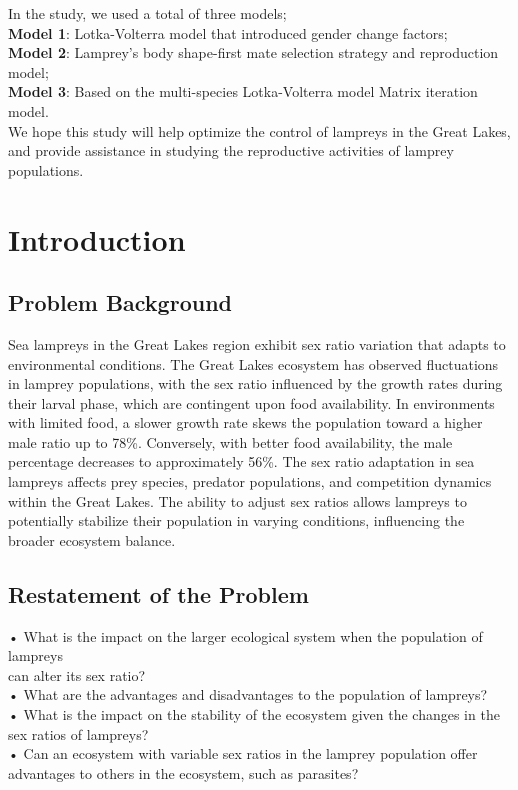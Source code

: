 \documentclass[12pt]{article}
\begin{document}
In the study, we used a total of three models; \\
\textbf{Model 1}: Lotka-Volterra model that introduced gender change factors;\\
\textbf{Model 2}: Lamprey's body shape-first mate selection strategy and reproduction model;\\
\textbf{Model 3}: Based on the multi-species Lotka-Volterra model Matrix iteration model. \\We hope this study will help optimize the control of lampreys in the Great Lakes, and provide assistance in studying the reproductive activities of lamprey populations. 
\newpage
\tableofcontents
\newpage
\clearpage
\pagestyle{fancy}
\newpage
\setcounter{page}{1}


\section{Introduction}
\subsection{Problem Background}
Sea lampreys in the Great Lakes region exhibit sex ratio variation that adapts to environmental conditions. 
The Great Lakes ecosystem has observed fluctuations in lamprey populations, with the sex ratio influenced by 
the growth rates during their larval phase, which are contingent upon food availability. In environments with 
limited food, a slower growth rate skews the population toward a higher male ratio up to 78\%. Conversely, with 
better food availability, the male percentage decreases to approximately 56\%. The sex ratio adaptation in sea 
lampreys affects prey species, predator populations, and competition dynamics within the Great Lakes. The ability 
to adjust sex ratios allows lampreys to potentially stabilize their population in varying conditions, influencing 
the broader ecosystem balance.
\subsection{Restatement of the Problem}
• What is the impact on the larger ecological system when the population of lampreys\\
 can alter its sex ratio?\\
• What are the advantages and disadvantages to the population of lampreys?\\
• What is the impact on the stability of the ecosystem given the changes in the sex ratios of lampreys?\\
• Can an ecosystem with variable sex ratios in the lamprey population offer advantages to others in the ecosystem, such as parasites?\\
\end{document}
